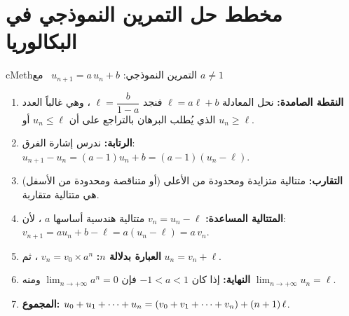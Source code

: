 \documentclass[12pt,a4paper]{article}
\newenvironment{BOX}[2]{\begin{otherlanguage}{english}\begin{arbox}{#1}{#2}}{\end{arbox}\end{otherlanguage}}
\newenvironment{tariqa}[1][طريقة]{\begin{BOX}{cMeth}{#1}}{\end{BOX}}
\renewcommand{\cdots}{\mathinner{\cdotp\cdotp\cdotp}}
\begin{document}
\section{مخطط حل التمرين النموذجي في البكالوريا}
\begin{tariqa}[التمرين النموذجي: $u_{n+1}=a\,u_n+b$ \ مع $a\ne1$]
\begin{enumerate}
\item \textbf{النقطة الصامدة:} نحل المعادلة $\ell=a\ell+b$ فنجد $\ell=\dfrac{b}{1-a}$ ، وهي غالباً العدد الذي يُطلب البرهان بالتراجع على أن $u_n\le\ell$ أو $u_n\ge\ell$.
\item \textbf{الرتابة:} ندرس إشارة الفرق: $u_{n+1}-u_n=(a-1)u_n+b=(a-1)(u_n-\ell)$.
\item \textbf{التقارب:} متتالية متزايدة ومحدودة من الأعلى (أو متناقصة ومحدودة من الأسفل) هي متتالية متقاربة.
\item \textbf{المتتالية المساعدة:} $v_n=u_n-\ell$ متتالية هندسية أساسها $a$ ، لأن: $v_{n+1}=a u_n+b-\ell=a(u_n-\ell)=a\,v_n$.
\item \textbf{العبارة بدلالة $n$:} $v_n=v_0\times a^n$ ، ثم $u_n=v_n+\ell$.
\item \textbf{النهاية:} إذا كان $-1<a<1$ فإن $\displaystyle\lim_{n\to+\infty}a^n=0$ ومنه $\displaystyle\lim_{n\to+\infty}u_n=\ell$.
\item \textbf{المجموع:} $u_0+u_1+\cdots+u_n=(v_0+v_1+\cdots+v_n)+(n+1)\,\ell$.
\end{enumerate}
\end{tariqa}
\end{document}
